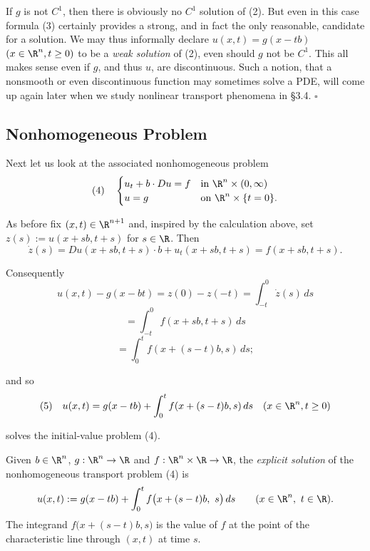 \begin{remark}
\label{rem:transport-equation-weak-solution-discontinuous-data}
If $g$ is not $C^1$, then there is obviously no $C^1$ solution of (2). But even in this case formula (3) certainly provides a strong, and in fact the only reasonable, candidate for a solution. We may thus informally declare $u(x,t) = g(x - tb)$ $(x \in \R^n, t \geq 0)$ to be a \textit{weak solution} of (2), even should $g$ not be $C^1$. This all makes sense even if $g$, and thus $u$, are discontinuous. Such a notion, that a nonsmooth or even discontinuous function may sometimes solve a PDE, will come up again later when we study nonlinear transport phenomena in \S3.4. $\square$
\end{remark}

\subsection{Nonhomogeneous Problem}
\label{sec:transport-equation-nonhomogeneous-problem}

Next let us look at the associated nonhomogeneous problem
$$(4) \quad \begin{cases} u_t + b \cdot Du = f & \text{in } \R^n \times (0, \infty) \\ u = g & \text{on } \R^n \times \{t = 0\}. \end{cases}$$

As before fix $(x,t) \in \R^{n+1}$ and, inspired by the calculation above, set $z(s) := u(x + sb, t + s)$ for $s \in \R$. Then
$$\dot{z}(s) = Du(x + sb, t + s) \cdot b + u_t(x + sb, t + s) = f(x + sb, t + s).$$

Consequently
$$u(x,t) - g(x - bt) = z(0) - z(-t) = \int_{-t}^0 \dot{z}(s)\,ds$$
$$= \int_{-t}^0 f(x + sb, t + s)\,ds$$
$$= \int_0^t f(x + (s-t)b, s)\,ds;$$

and so
$$(5) \quad u(x,t) = g(x - tb) + \int_0^t f(x + (s-t)b, s)\,ds \quad (x \in \R^n, t \geq 0)$$

solves the initial-value problem (4).

\begin{definition}
\label{def:transport-nonhom-solution}
\leanok
Given $b \in \R^n$, $g : \R^n \to \R$ and $f : \R^n \times \R \to \R$, the
\textit{explicit solution} of the nonhomogeneous transport problem (4) is
$$u(x,t) := g(x - tb) + \int_0^t f\bigl(x + (s - t)b,\ s\bigr)\,ds
  \qquad (x \in \R^n,\ t \in \R).$$
The integrand $f\bigl(x + (s - t)b, s\bigr)$ is the value of $f$ at the point of
the characteristic line through $(x,t)$ at time $s$.
\end{definition}

